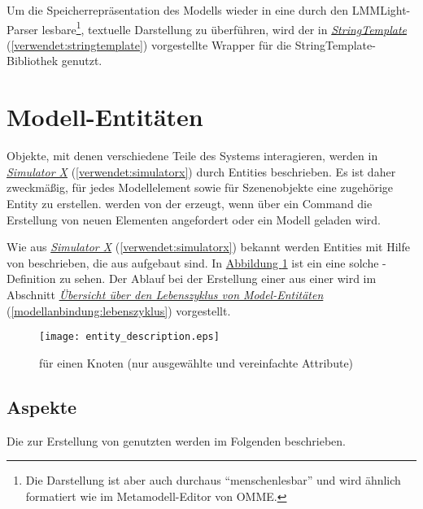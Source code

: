 \documentclass[a4paper,10pt]{sphinxmanual}
\begin{document}
Um die Speicherrepräsentation des Modells wieder in eine durch den LMMLight-Parser lesbare\footnote{
Die Darstellung ist aber auch durchaus "`menschenlesbar"' und wird ähnlich formatiert wie im Metamodell-Editor von OMME.
}, textuelle Darstellung zu überführen, wird der in {\hyperref[verwendet:stringtemplate]{\emph{StringTemplate}}} (\autoref*{verwendet:stringtemplate}) vorgestellte Wrapper für die StringTemplate-Bibliothek genutzt.


\section{Modell-Entitäten}
\label{modellanbindung:modell-entitaten}\label{modellanbindung:model-entities}
Objekte, mit denen verschiedene Teile des Systems interagieren, werden in {\hyperref[verwendet:simulatorx]{\emph{Simulator X}}} (\autoref*{verwendet:simulatorx}) durch Entities beschrieben.
Es ist daher zweckmäßig, für jedes Modellelement sowie für Szenenobjekte eine zugehörige Entity zu erstellen.
 werden von der  erzeugt, wenn über ein Command die Erstellung von neuen Elementen angefordert oder ein Modell geladen wird.

Wie aus {\hyperref[verwendet:simulatorx]{\emph{Simulator X}}} (\autoref*{verwendet:simulatorx}) bekannt werden Entities mit Hilfe von  beschrieben, die aus  aufgebaut sind.
In \hyperref[modellanbindung:entity-description]{Abbildung  \ref*{modellanbindung:entity-description}} ist ein eine solche -Definition zu sehen.
Der Ablauf bei der Erstellung einer  aus einer  wird im Abschnitt {\hyperref[modellanbindung:lebenszyklus]{\emph{Übersicht über den Lebenszyklus von Model-Entitäten}}} (\autoref*{modellanbindung:lebenszyklus}) vorgestellt.
\begin{figure}[htbp]
\centering
\capstart

\texttt{[image: entity\_description.eps]}
\caption{ für einen Knoten (nur ausgewählte und vereinfachte Attribute)}\label{modellanbindung:entity-description}\end{figure}


\subsection{Aspekte}
\label{modellanbindung:aspekte}\label{modellanbindung:modelentities-aspects}
Die zur Erstellung von  genutzten  werden im Folgenden beschrieben.
\end{document}
